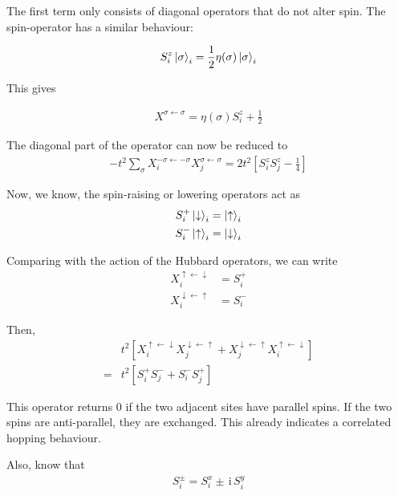 \documentclass[]{report}
\newcommand{\I}{\,\mathrm{i}\,}
\begin{document}
The first term only consists of diagonal operators that do not alter spin. The spin-operator has a similar behaviour:

\begin{align}
S^{z}_{i} \ket{\sigma}_i = \frac{1}{2} \eta(\sigma) \ket{\sigma}_i
\end{align}

This gives

\begin{align}
X^{\sigma \leftarrow \sigma} = \eta(\sigma) S^{z}_{i} + \frac{1}{2}
\end{align}

The diagonal part of the operator can now be reduced to
\begin{align}\label{eqn:2sitediag}
-t^2 \sum_{\sigma}  X^{-\sigma \leftarrow -\sigma}_i  X^{\sigma \leftarrow \sigma}_j = 2 t^2 \left[ S^{z}_{i} S^{z}_{j} - \frac{1}{4} \right]
\end{align}

Now, we know, the spin-raising or lowering operators act as
\begin{align}
S^{+}_{i} \ket{\downarrow}_i &= \ket{\uparrow}_i\\
S^{-}_{i} \ket{\uparrow}_i &= \ket{\downarrow}_i
\end{align}

Comparing with the action of the Hubbard operators, we can write
\begin{align}
X^{\uparrow \leftarrow \downarrow}_{i} &= S^{+}_{i}\\
X^{\downarrow \leftarrow \uparrow}_{i} &= S^{-}_{i}
\end{align}

Then,
\begin{align}\label{eqn:2siteoffdiag}
\nonumber
&t^2 \left[ X^{\uparrow \leftarrow \downarrow}_{i} X^{\downarrow \leftarrow \uparrow}_{j} + X^{\downarrow \leftarrow \uparrow}_{j} X^{\uparrow \leftarrow \downarrow}_{i} \right]\\
\nonumber
=& t^2 \left[ S^{+}_{i}S^{-}_{j} + S^{-}_{i}S^{+}_{j}  \right]
\end{align}

This operator returns 0 if the two adjacent sites have parallel spins. If the two spins are anti-parallel, they are exchanged. This already indicates a correlated hopping behaviour.

Also, know that
\begin{align}
S^{\pm}_i = S^{x}_i \pm \I S^{y}_i
\end{align}
\end{document}
